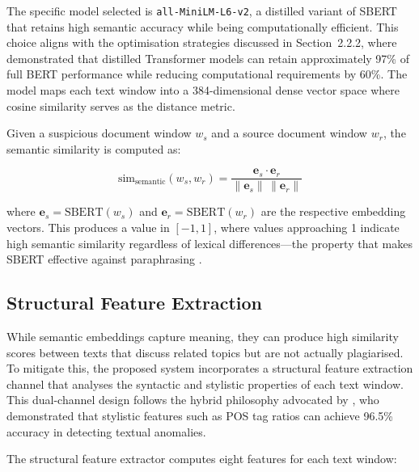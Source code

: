 \documentclass[12pt, a4paper]{article}
\begin{document}
The specific model selected is \texttt{all-MiniLM-L6-v2}, a distilled variant of SBERT that retains high semantic accuracy while being computationally efficient. This choice aligns with the optimisation strategies discussed in Section~2.2.2, where \citet{JingLiu2023} demonstrated that distilled Transformer models can retain approximately 97\% of full BERT performance while reducing computational requirements by 60\%. The model maps each text window into a 384-dimensional dense vector space where cosine similarity serves as the distance metric.

Given a suspicious document window $w_s$ and a source document window $w_r$, the semantic similarity is computed as:

\begin{equation}
	\text{sim}_{\text{semantic}}(w_s, w_r) = \frac{\mathbf{e}_s \cdot \mathbf{e}_r}{\|\mathbf{e}_s\| \, \|\mathbf{e}_r\|}
	\label{eq:cosine}
\end{equation}

\noindent where $\mathbf{e}_s = \text{SBERT}(w_s)$ and $\mathbf{e}_r = \text{SBERT}(w_r)$ are the respective embedding vectors. This produces a value in $[-1, 1]$, where values approaching 1 indicate high semantic similarity regardless of lexical differences---the property that makes SBERT effective against paraphrasing \citep{LiuZhu2023}.

\subsection{Structural Feature Extraction}

While semantic embeddings capture meaning, they can produce high similarity scores between texts that discuss related topics but are not actually plagiarised. To mitigate this, the proposed system incorporates a structural feature extraction channel that analyses the syntactic and stylistic properties of each text window. This dual-channel design follows the hybrid philosophy advocated by \citet{ElRashidy2024}, who demonstrated that stylistic features such as POS tag ratios can achieve 96.5\% accuracy in detecting textual anomalies.

The structural feature extractor computes eight features for each text window:
\end{document}

